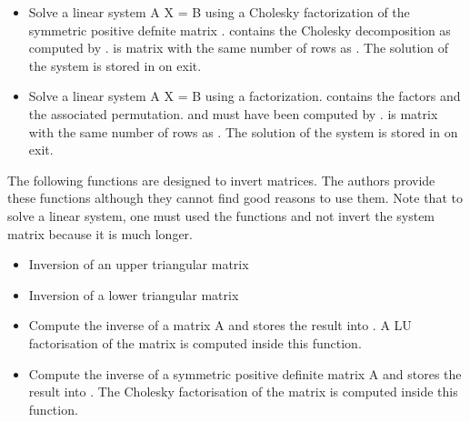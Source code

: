 \begin{itemize}
\item {}
  \sshortdescribe Solve a linear system A X = B using a Cholesky factorization
  of the symmetric positive defnite matrix .   contains the
  Cholesky decomposition as computed by .  is matrix
  with the same number of rows as . The solution of
  the system is stored in  on exit. 

\item {}
  \sshortdescribe Solve a linear system A X = B using a  factorization.
   contains the  factors and  the associated permutation.
   and  must have been computed by .  is matrix
  with the same number of rows as .
  The solution of the system is stored in  on exit. 

\end{itemize}


The following functions are designed to invert matrices. The authors provide
these functions although they cannot find good reasons to use them. Note that
to solve a linear system, one must used the  functions and not
invert the system matrix because it is much longer.
\begin{itemize}
\item {}
  \sshortdescribe Inversion of an upper triangular matrix  

\item {}
  \sshortdescribe Inversion of a lower triangular matrix  

\item {}
  \sshortdescribe Compute the inverse of a matrix A and stores the result
  into . A LU factorisation of the matrix  is computed
  inside this function.
\item {}
  \sshortdescribe Compute the inverse of a symmetric positive definite matrix
  A and stores the result into . The Cholesky factorisation of
  the matrix  is computed inside this function.
\end{itemize}

